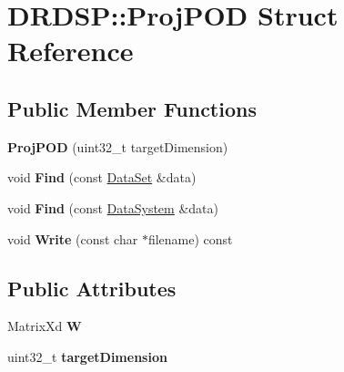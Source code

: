\hypertarget{struct_d_r_d_s_p_1_1_proj_p_o_d}{\section{D\-R\-D\-S\-P\-:\-:Proj\-P\-O\-D Struct Reference}
\label{struct_d_r_d_s_p_1_1_proj_p_o_d}
}
\subsection*{Public Member Functions}
\begin{DoxyCompactItemize}
\item 
\hypertarget{struct_d_r_d_s_p_1_1_proj_p_o_d_ab18933b48188141ad6759f99a29df128}{{\bfseries Proj\-P\-O\-D} (uint32\-\_\-t target\-Dimension)}\label{struct_d_r_d_s_p_1_1_proj_p_o_d_ab18933b48188141ad6759f99a29df128}

\item 
\hypertarget{struct_d_r_d_s_p_1_1_proj_p_o_d_ac9f95c6bc8a50ef1c714e32712449073}{void {\bfseries Find} (const \hyperlink{struct_d_r_d_s_p_1_1_data_set}{Data\-Set} \&data)}\label{struct_d_r_d_s_p_1_1_proj_p_o_d_ac9f95c6bc8a50ef1c714e32712449073}

\item 
\hypertarget{struct_d_r_d_s_p_1_1_proj_p_o_d_a47ceedabfdb2198401808fda62c4fe35}{void {\bfseries Find} (const \hyperlink{struct_d_r_d_s_p_1_1_data_system}{Data\-System} \&data)}\label{struct_d_r_d_s_p_1_1_proj_p_o_d_a47ceedabfdb2198401808fda62c4fe35}

\item 
\hypertarget{struct_d_r_d_s_p_1_1_proj_p_o_d_a78b437529229440941c60b44cee5144a}{void {\bfseries Write} (const char $\ast$filename) const }\label{struct_d_r_d_s_p_1_1_proj_p_o_d_a78b437529229440941c60b44cee5144a}

\end{DoxyCompactItemize}
\subsection*{Public Attributes}
\begin{DoxyCompactItemize}
\item 
\hypertarget{struct_d_r_d_s_p_1_1_proj_p_o_d_accfcb1fe9ae69a35a85d74732a04c9c7}{Matrix\-Xd {\bfseries W}}\label{struct_d_r_d_s_p_1_1_proj_p_o_d_accfcb1fe9ae69a35a85d74732a04c9c7}

\item 
\hypertarget{struct_d_r_d_s_p_1_1_proj_p_o_d_acdfe762ff68aa2be10d16797312a8215}{uint32\-\_\-t {\bfseries target\-Dimension}}\label{struct_d_r_d_s_p_1_1_proj_p_o_d_acdfe762ff68aa2be10d16797312a8215}

\end{DoxyCompactItemize}
